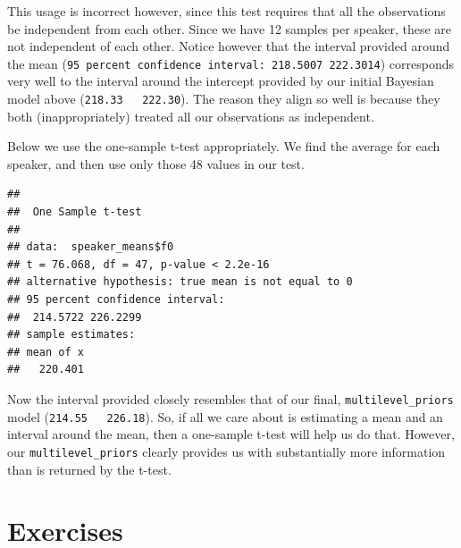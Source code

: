 \documentclass[
]{book}
\newenvironment{Shaded}{\begin{snugshade}}{\end{snugshade}}
\newcommand{\AttributeTok}[1]{\textcolor[rgb]{0.77,0.63,0.00}{#1}}
\newcommand{\FunctionTok}[1]{\textcolor[rgb]{0.00,0.00,0.00}{#1}}
\newcommand{\NormalTok}[1]{#1}
\newcommand{\OtherTok}[1]{\textcolor[rgb]{0.56,0.35,0.01}{#1}}
\newcommand{\SpecialCharTok}[1]{\textcolor[rgb]{0.00,0.00,0.00}{#1}}
\begin{document}
This usage is incorrect however, since this test requires that all the observations be independent from each other. Since we have 12 samples per speaker, these are not independent of each other. Notice however that the interval provided around the mean (\texttt{95\ percent\ confidence\ interval:\ 218.5007\ 222.3014}) corresponds very well to the interval around the intercept provided by our initial Bayesian model above (\texttt{218.33\ \ \ 222.30}). The reason they align so well is because they both (inappropriately) treated all our observations as independent.

Below we use the one-sample t-test appropriately. We find the average for each speaker, and then use only those 48 values in our test.

\begin{Shaded}
\end{Shaded}

\begin{verbatim}
## 
##  One Sample t-test
## 
## data:  speaker_means$f0
## t = 76.068, df = 47, p-value < 2.2e-16
## alternative hypothesis: true mean is not equal to 0
## 95 percent confidence interval:
##  214.5722 226.2299
## sample estimates:
## mean of x 
##   220.401
\end{verbatim}

Now the interval provided closely resembles that of our final, \texttt{multilevel\_priors} model (\texttt{214.55\ \ \ 226.18}). So, if all we care about is estimating a mean and an interval around the mean, then a one-sample t-test will help us do that. However, our \texttt{multilevel\_priors} clearly provides us with substantially more information than is returned by the t-test.

\hypertarget{exercises-1}{%
\section{Exercises}\label{exercises-1}}
\end{document}
